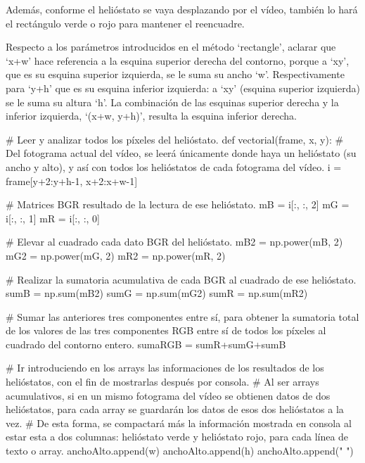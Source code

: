 \documentclass[12pt]{article}
\begin{document}
Además, conforme el helióstato se vaya desplazando por el vídeo, también lo hará el rectángulo verde o rojo para mantener el reencuadre.

Respecto a los parámetros introducidos en el método ‘rectangle’, aclarar que ‘x+w’ hace referencia a la esquina superior derecha del contorno, porque a ‘xy’, que es su esquina superior izquierda, se le suma su ancho ‘w’. Respectivamente para ‘y+h’ que es su esquina inferior izquierda: a ‘xy’ (esquina superior izquierda) se le suma su altura ‘h’. La combinación de las esquinas superior derecha y la inferior izquierda, ‘(x+w, y+h)’, resulta la esquina inferior derecha.


            \# Leer y analizar todos los píxeles del helióstato.
            def vectorial(frame, x, y):
                \# Del fotograma actual del vídeo, se leerá únicamente donde haya un helióstato (su ancho y alto), y así con todos los helióstatos de cada fotograma del vídeo.
                i = frame[y+2:y+h-1, x+2:x+w-1]
                
                \# Matrices BGR resultado de la lectura de ese helióstato.
                mB = i[:, :, 2]
                mG = i[:, :, 1]
                mR = i[:, :, 0]
                                
                \# Elevar al cuadrado cada dato BGR del helióstato.
                mB2 = np.power(mB, 2)
                mG2 = np.power(mG, 2)
                mR2 = np.power(mR, 2)

                \# Realizar la sumatoria acumulativa de cada BGR al cuadrado de ese helióstato.
                sumB = np.sum(mB2)
                sumG = np.sum(mG2)
                sumR = np.sum(mR2)

                \# Sumar las anteriores tres componentes entre sí, para obtener la sumatoria total de los valores de las tres componentes RGB entre sí de todos los píxeles al cuadrado del contorno entero.
                sumaRGB = sumR+sumG+sumB
                
                \# Ir introduciendo en los arrays las informaciones de los resultados de los helióstatos, con el fin de mostrarlas después por consola.
                \# Al ser arrays acumulativos, si en un mismo fotograma del vídeo se obtienen datos de dos helióstatos, para cada array se guardarán los datos de esos dos helióstatos a la vez.
                \# De esta forma, se compactará más la información mostrada en consola al estar esta a dos columnas: helióstato verde y helióstato rojo, para cada línea de texto o array.
                anchoAlto.append(w)
                anchoAlto.append(h)
                anchoAlto.append("                      ")
                
\end{document}
